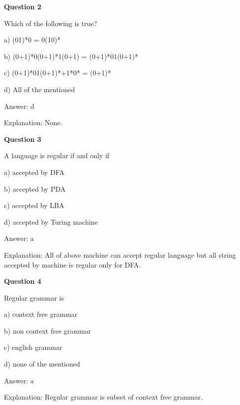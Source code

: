 \documentclass{article}
\begin{document}
\begin{mdframed}[linewidth=1pt, roundcorner=5pt, linecolor=gray!30, backgroundcolor=gray!5]
\textbf{Question 2} 

Which of the following is true?

a) (01)*0 = 0(10)*

b) (0+1)*0(0+1)*1(0+1) = (0+1)*01(0+1)*

c) (0+1)*01(0+1)*+1*0* = (0+1)*

d) All of the mentioned
\vspace{5pt} \par
\begin{tcolorbox}[colback=green!5, colframe=green!40!black, title=Solution]
Answer: d

Explanation: None.
\end{tcolorbox}
\end{mdframed}

\begin{mdframed}[linewidth=1pt, roundcorner=5pt, linecolor=gray!30, backgroundcolor=gray!5]
\textbf{Question 3} 

A language is regular if and only if

a) accepted by DFA

b) accepted by PDA

c) accepted by LBA

d) accepted by Turing machine
\vspace{5pt} \par
\begin{tcolorbox}[colback=green!5, colframe=green!40!black, title=Solution]
Answer: a

Explanation: All of above machine can accept regular language but all string accepted by machine is regular only for DFA.
\end{tcolorbox}
\end{mdframed}
\newpage

\begin{mdframed}[linewidth=1pt, roundcorner=5pt, linecolor=gray!30, backgroundcolor=gray!5]
\textbf{Question 4} 

Regular grammar is

a) context free grammar

b) non context free grammar

c) english grammar

d) none of the mentioned
\vspace{5pt} \par
\begin{tcolorbox}[colback=green!5, colframe=green!40!black, title=Solution]
Answer: a

Explanation: Regular grammar is subset of context free grammar.
\end{tcolorbox}
\end{mdframed}
\end{document}
